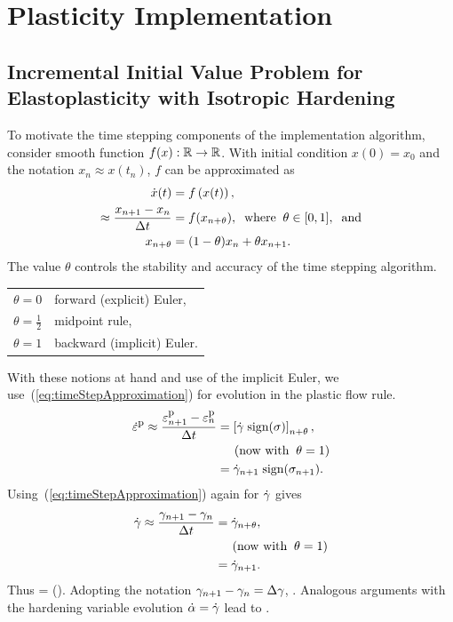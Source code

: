 

\section{Plasticity Implementation}
\subsection{Incremental Initial Value 
Problem for Elastoplasticity with Isotropic Hardening}

To motivate the time stepping components of the 
implementation algorithm, consider
smooth function $f(x): \mathbb{R} \rightarrow \mathbb{R}$.
With initial condition $x(0) = x_0$ 
and the notation $x_n \approx x(t_n)$, $f$ can be 
approximated as 
\begin{align}
 \dot{x}(t) & = f\left(x(t)\right), \\
\approx  \displaystyle\frac{x_{n+1} - x_n}{\Delta t} & = f(x_{n+\theta}), \;\; 
\mbox{where} \;\; \theta \in [0, 1], \;\; \mbox{and}
 \label{eq:timeStepApproximation} \\
  x_{n+\theta} & = (1-\theta) x_n + \theta x_{n+1}.
\end{align}
The value $\theta$ controls the stability and 
accuracy of the time stepping algorithm.  
\be
\begin{tabular}{ll}
 $\theta = 0$ & forward (explicit) Euler, \\
 $\theta = \frac{1}{2}$ & midpoint rule,  \\
 $\theta = 1$ & backward (implicit) Euler.
\end{tabular}
\ee
With these notions at hand and use of the implicit Euler, 
we use~(\ref{eq:timeStepApproximation}) for evolution in the plastic flow rule.
\begin{align}
\dot{\varepsilon}^{\mbox{\footnotesize p}} \approx \displaystyle\frac{\varepsilon^{\mbox{\footnotesize p}}_{n+1} - \varepsilon^{\mbox{\footnotesize p}}_{n}}{\Delta t} 
& = \left[ \dot{\gamma} \; \mbox{sign}(\sigma) \right]_{n+\theta}, \\
 & \hspace{0.5cm} (\mbox{now with} \;\; \theta = 1) \nonumber \\
 & = \dot{\gamma}_{n+1} \; \mbox{sign}(\sigma_{n+1}).
\end{align}
Using~(\ref{eq:timeStepApproximation}) again for $\dot{\gamma}$ gives
\begin{align}
\dot{\gamma} \approx \displaystyle\frac{\gamma_{n+1} - \gamma_n}{\Delta t} & 
= \dot{\gamma}_{n+\theta}, \\
 & \hspace{0.5cm} (\mbox{now with} \;\; \theta = 1) \nonumber \\
 & = \dot{\gamma}_{n+1}.
\end{align}
Thus
\be
\hstrainpdot \approx \dst{} 
= \dst{} \; \sign(\sigmanp).
\ee
Adopting the notation $\gamma_{n+1} - \gamma_n = \Delta\gamma$, 
\be
\boxed{\hstrainpnp = \hstrainpn + \Delta\gamma \; \sign(\sigmanp)}.
 \label{eq:plasticStrainDiscrete}
\ee 
Analogous arguments with the hardening 
variable evolution $\dot{\alpha} = \dot{\gamma}$ lead to
\be
 \boxed{\alphanp = \alphan + \Delta\gamma}.
 \label{eq:alphaDicrete}
\ee

